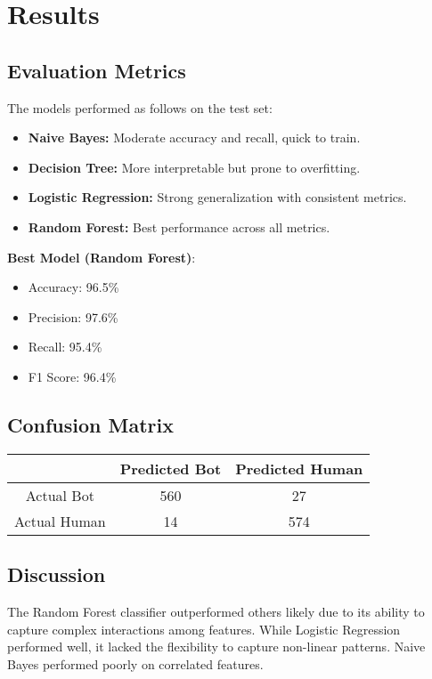 \documentclass[conference]{IEEEtran}
\begin{document}
\section{Results}
\subsection{Evaluation Metrics}
The models performed as follows on the test set:

\begin{itemize}
    \item \textbf{Naive Bayes:} Moderate accuracy and recall, quick to train.
    \item \textbf{Decision Tree:} More interpretable but prone to overfitting.
    \item \textbf{Logistic Regression:} Strong generalization with consistent metrics.
    \item \textbf{Random Forest:} Best performance across all metrics.
\end{itemize}

\textbf{Best Model (Random Forest)}:
\begin{itemize}
    \item Accuracy: 96.5\%
    \item Precision: 97.6\%
    \item Recall: 95.4\%
    \item F1 Score: 96.4\%
\end{itemize}

\subsection{Confusion Matrix}
\begin{center}
\begin{tabular}{|c|c|c|}
\hline
 & Predicted Bot & Predicted Human \\
\hline
Actual Bot & 560 & 27 \\
\hline
Actual Human & 14 & 574 \\
\hline
\end{tabular}
\end{center}

\subsection{Discussion}
The Random Forest classifier outperformed others likely due to its ability to capture complex interactions among features. While Logistic Regression performed well, it lacked the flexibility to capture non-linear patterns. Naive Bayes performed poorly on correlated features.
\end{document}
